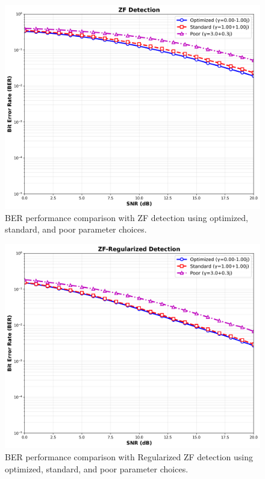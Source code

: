 \begin{figure}[!t]
\centering
\includegraphics[width=0.9\columnwidth]{figures/zf_detection.png} 
\caption{BER performance comparison with ZF detection using optimized, standard, and poor parameter choices.}
\label{fig:zf_plot}
\end{figure}

\begin{figure}[!t]
\centering
\includegraphics[width=0.9\columnwidth]{figures/zf_reg_detection.png}
\caption{BER performance comparison with Regularized ZF detection using optimized, standard, and poor parameter choices.}
\label{fig:zf_reg_plot}
\end{figure}

